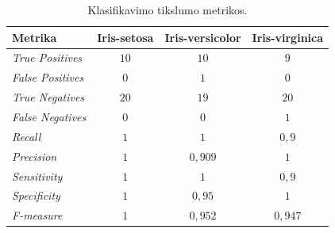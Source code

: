 \begin{table}[H]
    \centering
    \caption{Klasifikavimo tikslumo metrikos.}
    \begin{tabular}{|l|c|c|c|}
        \hline
        \textbf{Metrika} & \textbf{Iris-setosa} & \textbf{Iris-versicolor} & \textbf{Iris-virginica} \\
        \hline
        \textit{True Positives}   & $10$  & $10$  & $9$ \\ \hline
        \textit{False Positives}  & $0$  & $1$   & $0$  \\ \hline
        \textit{True Negatives}   & $20$ & $19$  & $20$ \\ \hline
        \textit{False Negatives}  & $0$  & $0$   & $1$  \\ \hline
        \textit{Recall}           & $1$  & $1$       & $0{,}9$ \\ \hline
        \textit{Precision}        & $1$  & $0{,}909$ & $1$ \\ \hline
        \textit{Sensitivity}      & $1$  & $1$       & $0{,}9$ \\ \hline
        \textit{Specificity}      & $1$  & $0{,}95$ & $1$ \\ \hline
        \textit{F-measure}        & $1$  & $0{,}952$ & $0{,}947$ \\ \hline
    \end{tabular}
    \label{tab:testavimo_klasifikavimo_metrikos}
\end{table}